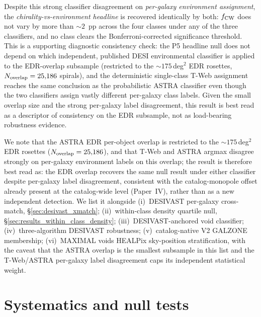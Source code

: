 \documentclass[aps,prd,twocolumn,superscriptaddress,showpacs,preprintnumbers,nofootinbib,longbibliography,floatfix]{revtex4-2}
\begin{document}
Despite this strong classifier disagreement on \emph{per-galaxy
environment assignment}, the \emph{chirality-vs-environment headline}
is recovered identically by both: $f_{\rm CW}$ does not vary by more
than $\sim\!2$~pp across the four classes under any of the three
classifiers, and no class clears the Bonferroni-corrected significance
threshold. This is a supporting diagnostic consistency check: the P5 headline null
does not depend on which independent, published DESI environmental
classifier is applied to the EDR-overlap subsample (restricted to the
$\sim\!175$\,deg$^2$ EDR rosettes, $N_{\rm overlap}=25{,}186$ spirals),
and the deterministic single-class T-Web assignment reaches the same
conclusion as the probabilistic ASTRA classifier even though the two
classifiers assign vastly different per-galaxy class labels. Given the
small overlap size and the strong per-galaxy label disagreement, this
result is best read as a descriptor of consistency on the EDR subsample,
not as load-bearing robustness evidence.

We note that the ASTRA EDR
per-object overlap is restricted to the $\sim\!175$\,deg$^2$ EDR
rosettes ($N_{\rm overlap}=25{,}186$), and that T-Web and ASTRA argmax
disagree strongly on per-galaxy environment labels on this overlap;
the result is therefore best read as: the EDR overlap recovers the
same null result under either classifier despite per-galaxy label
disagreement, consistent with the catalog-monopole offset already
present at the catalog-wide level (Paper~IV), rather than as a new
independent detection. We list it alongside (i)~DESIVAST per-galaxy
cross-match, \S\ref{sec:desivast_xmatch}; (ii)~within-class density
quartile null, \S\ref{sec:results_within_class_density};
(iii)~DESIVAST-anchored void classifier;
(iv)~three-algorithm DESIVAST robustness;
(v)~catalog-native V2 GALZONE membership;
(vi)~MAXIMAL voids HEALPix sky-position stratification, with the
caveat that the ASTRA overlap is the smallest subsample in this
list and the T-Web/ASTRA per-galaxy label disagreement caps its
independent statistical weight.

\section{Systematics and null tests}\label{sec:systematics}
\end{document}
